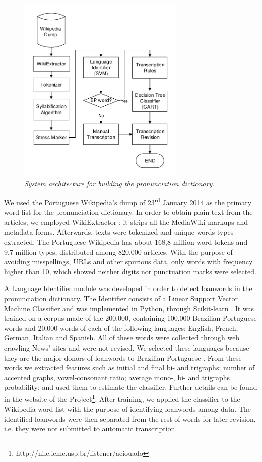 \begin{figure}[t]
\centerline{ \includegraphics[width=8cm]{./gfx/flowchart_mod.pdf}}
\caption{{\it System architecture for building the pronunciation dictionary.}}
\label{g2p-architecture}
\end{figure}

We used the Portuguese Wikipedia's dump of 23\textsuperscript{rd} January 2014 as the primary word list for the pronunciation dictionary. In order to obtain plain text from the articles, we employed WikiExtractor \cite{Wikiextractor2013}; it strips all the  MediaWiki markups and metadata forms. Afterwards, texts were tokenized and unique words types extracted. The Portuguese Wikipedia has about 168,8 million word tokens and 9,7 million types, distributed among  820,000 articles. With the purpose of avoiding misspellings, URLs and other spurious data, only words with frequency higher than 10, which showed neither digits nor punctuation marks were selected. 

A Language Identifier module was developed in order to detect loanwords in the pronunciation dictionary. The Identifier consists of a Linear Support Vector Machine Classifier \cite{Steinwart2008} and was implemented in Python, through Scikit-learn \cite{Scikit2011}. It was trained on a corpus made of the 200,000, containing 100,000 Brazilian Portuguese words and 20,000 words of each of the following languages: English, French, German, Italian and Spanish. All of these words were collected through web crawling News' sites and were not revised. We selected these languages because they are the major donors of loanwords to Brazilian Portuguese \cite{Alves2001}. From these words we extracted features such as initial and final bi- and trigraphs;  number of accented graphs, vowel-consonant ratio; average mono-, bi- and trigraphs probability; and used them to estimate the classifier. Further details can be found in the website of the Project\footnote{http://nilc.icmc.usp.br/listener/aeiouado}. After training, we applied the classifier to the Wikipedia word list with the purpose of identifying loanwords among data. The identified loanwords were then separated from the rest of words for later revision, i.e. they were not submitted to automatic transcription.

